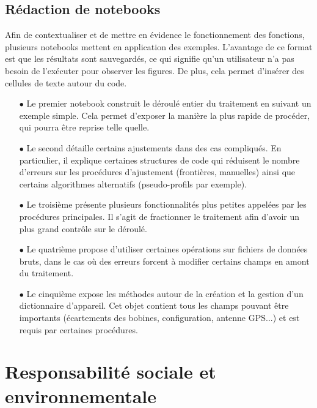 \documentclass[12pt]{article}
\begin{document}
\newpage
\subsection{Rédaction de notebooks}

    Afin de contextualiser et de mettre en évidence le fonctionnement des fonctions, plusieurs notebooks mettent en application des exemples. L'avantage de ce format est que les résultats sont sauvegardés, ce qui signifie qu'un utilisateur n'a pas besoin de l'exécuter pour observer les figures. De plus, cela permet d'insérer des cellules de texte autour du code.

    \begin{enumerate}
        \item[$\bullet$] Le premier notebook construit le déroulé entier du traitement en suivant un exemple simple. Cela permet d'exposer la manière la plus rapide de procéder, qui pourra être reprise telle quelle.

        \item[$\bullet$] Le second détaille certains ajustements dans des cas compliqués. En particulier, il explique certaines structures de code qui réduisent le nombre d'erreurs sur les procédures d'ajustement (frontières, manuelles) ainsi que certains algorithmes alternatifs (pseudo-profils par exemple).

        \item[$\bullet$] Le troisième présente plusieurs fonctionnalités plus petites appelées par les procédures principales. Il s'agit de fractionner le traitement afin d'avoir un plus grand contrôle sur le déroulé.
        
        \item[$\bullet$] Le quatrième propose d'utiliser certaines opérations sur fichiers de données bruts, dans le cas où des erreurs forcent à modifier certains champs en amont du traitement.

        \item[$\bullet$] Le cinquième expose les méthodes autour de la création et la gestion d'un dictionnaire d'appareil. Cet objet contient tous les champs pouvant être importants (écartements des bobines, configuration, antenne GPS...) et est requis par certaines procédures.
    \end{enumerate}

\section{Responsabilité sociale et environnementale}
\end{document}
